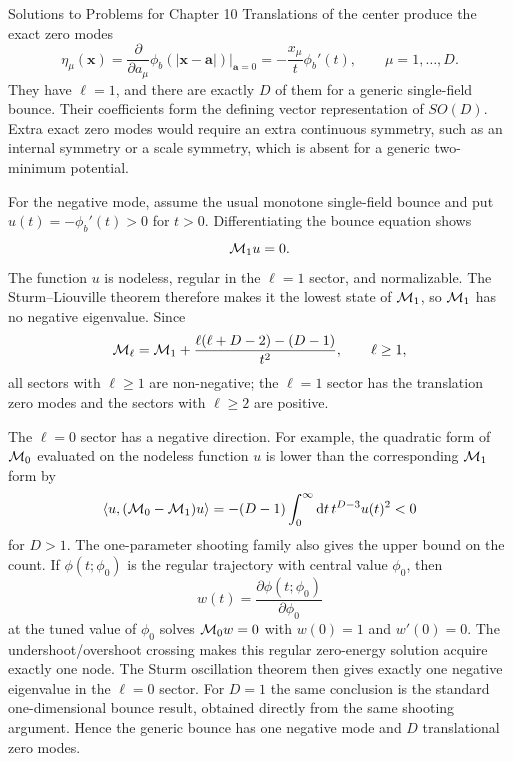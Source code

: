\begin{bankssolutions}{Solutions to Problems for Chapter 10}
Translations of the center produce the exact zero modes
\[
\eta_\mu(\mathbf x)=\frac{\partial}{\partial a_\mu}
 \phi_b(|\mathbf x-\mathbf a|)\bigg|_{\mathbf a=0}
 =-\frac{x_\mu}{t}\phi_b'(t),
 \qquad \mu=1,\ldots,D.
\]
They have $\ell=1$, and there are exactly $D$ of them for a generic
single-field bounce.  Their coefficients form the defining vector
representation of $SO(D)$.  Extra exact zero modes would require an extra
continuous symmetry, such as an internal symmetry or a scale symmetry, which
is absent for a generic two-minimum potential.

For the negative mode, assume the usual monotone single-field bounce and put
$u(t)=-\phi_b'(t)>0$ for $t>0$.  Differentiating the bounce equation shows
\[
 {\cal M}_1u=0.
\]
The function $u$ is nodeless, regular in the $\ell=1$ sector, and normalizable.
The Sturm--Liouville theorem therefore makes it the lowest state of
${\cal M}_1$, so ${\cal M}_1$ has no negative eigenvalue.  Since
\[
 {\cal M}_\ell={\cal M}_1+
 \frac{\ell(\ell+D-2)-(D-1)}{t^2},
 \qquad \ell\geq1,
\]
all sectors with $\ell\geq1$ are non-negative; the $\ell=1$ sector has the
translation zero modes and the sectors with $\ell\geq2$ are positive.

The $\ell=0$ sector has a negative direction.  For example, the quadratic
form of ${\cal M}_0$ evaluated on the nodeless function $u$ is lower than the
corresponding ${\cal M}_1$ form by
\[
 \langle u,({\cal M}_0-{\cal M}_1)u\rangle
 =-(D-1)\int_0^\infty\mathop{}\!\mathrm{d} t\,t^{D-3}u(t)^2<0
 \]
for $D>1$.  The one-parameter shooting family also gives the upper bound on
the count.  If $\phi(t;\phi_0)$ is the regular trajectory with central value
$\phi_0$, then
\[
 w(t)=\frac{\partial\phi(t;\phi_0)}{\partial\phi_0}
\]
at the tuned value of $\phi_0$ solves ${\cal M}_0w=0$ with
$w(0)=1$ and $w'(0)=0$.  The undershoot/overshoot crossing makes this regular
zero-energy solution acquire exactly one node.  The Sturm oscillation theorem
then gives exactly one negative eigenvalue in the $\ell=0$ sector.  For $D=1$
the same conclusion is the standard one-dimensional bounce result, obtained
directly from the same shooting argument.  Hence the generic bounce has one
negative mode and $D$ translational zero modes.


\end{bankssolutions}
